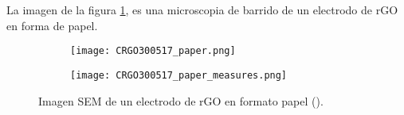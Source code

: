 La imagen de la figura \ref{fig:rgo_paper_sem}, es una microscopia de barrido de un electrodo de rGO en forma de papel.

\begin{figure}
	\centering
	\begin{subfigure}{\textwidth}
		\texttt{[image: CRGO300517\_paper.png]}
	\end{subfigure}
	\begin{subfigure}{\textwidth}
		\texttt{[image: CRGO300517\_paper\_measures.png]}
	\end{subfigure}
	\caption[Imagen SEM de un electrodo de rGO en formato papel]{Imagen SEM de un electrodo de rGO en formato papel (\mPapelAcero).}
	\label{fig:rgo_paper_sem}
\end{figure}

